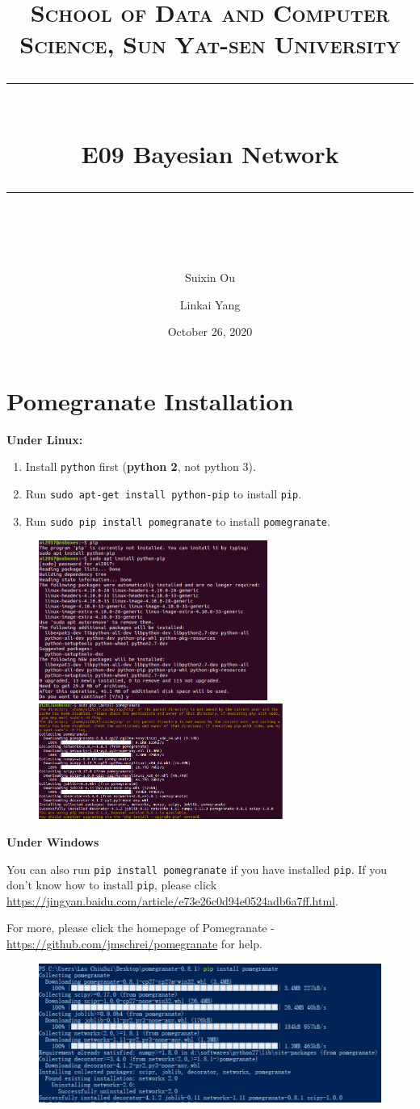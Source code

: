\documentclass[a4paper, 11pt]{article}
\title{	
\normalfont \normalsize
\textsc{School of Data and Computer Science, Sun Yat-sen University} \\ [25pt] %
\rule{\textwidth}{0.5pt} \\[0.4cm] %
\huge  E09 Bayesian Network \\ %
\rule{\textwidth}{2pt} \\[0.5cm] %
\author{Suixin Ou \and Linkai Yang}
\date{\normalsize October 26, 2020}
}
\begin{document}
\maketitle
\tableofcontents
\newpage
\section{Pomegranate Installation}
\textbf{Under Linux:}
\begin{enumerate}
\item Install \texttt{python} first (\textbf{python 2}, not python 3).
\item Run \texttt{sudo apt-get install python-pip} to install \texttt{pip}.
\item Run \texttt{sudo pip install pomegranate} to install \texttt{pomegranate}.
\end{enumerate}
\begin{figure}[h]
  \centering
  \includegraphics[width=7.5cm]{Pic/install1}
  \qquad
  \includegraphics[width=8cm]{Pic/install2}
\end{figure}
\textbf{Under Windows}

You can also run \texttt{pip install pomegranate} if you have installed \texttt{pip}. If you don't know how to install \texttt{pip}, please click \url{https://jingyan.baidu.com/article/e73e26c0d94e0524adb6a7ff.html}.

For more, please click the homepage of Pomegranate - \url{https://github.com/jmschrei/pomegranate} for help. 
\begin{figure}[h]

  
  \centering
\includegraphics[width=16cm]{Pic/po}
  
\end{figure}
\end{document}
